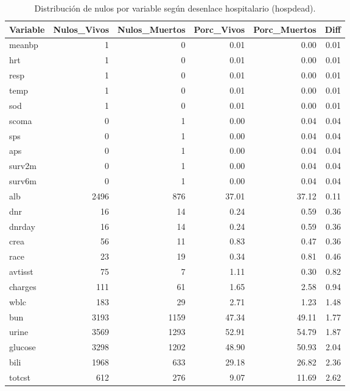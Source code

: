 \begin{table}[H]
  \centering
  \caption[Nulos por variable según hospdead]{Distribución de nulos por variable según desenlace hospitalario (hospdead).}
  \label{tab:nulos-hospdead}
  \small
  \begin{tabular}{lrrrrr}
    \toprule
    \textbf{Variable} & \textbf{Nulos\_Vivos} & \textbf{Nulos\_Muertos} & \textbf{Porc\_Vivos} & \textbf{Porc\_Muertos} & \textbf{Diff} \\
    \midrule
    meanbp   &    1 &    0 &  0.01 &  0.00 &  0.01 \\
    hrt      &    1 &    0 &  0.01 &  0.00 &  0.01 \\
    resp     &    1 &    0 &  0.01 &  0.00 &  0.01 \\
    temp     &    1 &    0 &  0.01 &  0.00 &  0.01 \\
    sod      &    1 &    0 &  0.01 &  0.00 &  0.01 \\
    scoma    &    0 &    1 &  0.00 &  0.04 &  0.04 \\
    sps      &    0 &    1 &  0.00 &  0.04 &  0.04 \\
    aps      &    0 &    1 &  0.00 &  0.04 &  0.04 \\
    surv2m   &    0 &    1 &  0.00 &  0.04 &  0.04 \\
    surv6m   &    0 &    1 &  0.00 &  0.04 &  0.04 \\
    alb      & 2496 &  876 & 37.01 & 37.12 &  0.11 \\
    dnr      &   16 &   14 &  0.24 &  0.59 &  0.36 \\
    dnrday   &   16 &   14 &  0.24 &  0.59 &  0.36 \\
    crea     &   56 &   11 &  0.83 &  0.47 &  0.36 \\
    race     &   23 &   19 &  0.34 &  0.81 &  0.46 \\
    avtisst  &   75 &    7 &  1.11 &  0.30 &  0.82 \\
    charges  &  111 &   61 &  1.65 &  2.58 &  0.94 \\
    wblc     &  183 &   29 &  2.71 &  1.23 &  1.48 \\
    bun      & 3193 & 1159 & 47.34 & 49.11 &  1.77 \\
    urine    & 3569 & 1293 & 52.91 & 54.79 &  1.87 \\
    glucose  & 3298 & 1202 & 48.90 & 50.93 &  2.04 \\
    bili     & 1968 &  633 & 29.18 & 26.82 &  2.36 \\
    totcst   &  612 &  276 &  9.07 & 11.69 &  2.62 \\

\end{tabular}
\end{table}
